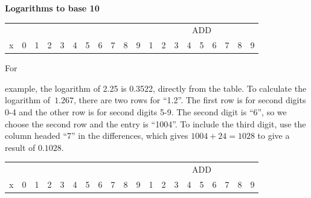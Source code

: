 \documentclass[10pt]{article}
\begin{document}
\begin{center}
  {\Large\bf Logarithms to base 10}
\end{center}

\pagestyle{empty}
\thispagestyle{empty}
\begin{centering}
  {\small
\begin{tabular}{|r|c|ccc|ccc|ccc|ccccccccc|}\hline
  &&&&&&&&&&&  \multicolumn{9}{|c|}{ADD} \\
  {\normalsize x}&
  {\normalsize 0}&{\normalsize 1}&{\normalsize 2}&
  {\normalsize 3}&{\normalsize 4}&{\normalsize 5}&
  {\normalsize 6}&{\normalsize 7}&{\normalsize 8}&
  {\normalsize 9}&{\normalsize 1}&{\normalsize 2}&
  {\normalsize 3}&{\normalsize 4}&{\normalsize 5}&
  {\normalsize 6}&{\normalsize 7}&{\normalsize 8}&
  {\normalsize 9}\\ \hline

\hline
\end{tabular}
}
\end{centering}

\noindent For \rule{0mm}{5mm}example, the logarithm of 2.25 is 0.3522,
directly from the table.  To calculate the logarithm of~$1.267$, there
are two rows for ``1.2''.  The first row is for second digits 0-4 and
the other row is for second digits 5-9.  The second digit is ``6'', so
we choose the second row and the entry is ``1004''.  To include the
third digit, use the column headed ``7'' in the differences, which
gives $1004+24=1028$ to give a result of $0.1028$.


  \centering
  \small
\begin{tabular}{|r|c|ccc|ccc|ccc|ccccccccc|}\hline
  &&&&&&&&&&&  \multicolumn{9}{|c|}{ADD} \\
  {\normalsize x}&
  {\normalsize 0}&{\normalsize 1}&{\normalsize 2}&
  {\normalsize 3}&{\normalsize 4}&{\normalsize 5}&
  {\normalsize 6}&{\normalsize 7}&{\normalsize 8}&
  {\normalsize 9}&{\normalsize 1}&{\normalsize 2}&
  {\normalsize 3}&{\normalsize 4}&{\normalsize 5}&
  {\normalsize 6}&{\normalsize 7}&{\normalsize 8}&
  {\normalsize 9}\\ \hline

\hline
\end{tabular}
\end{document}
